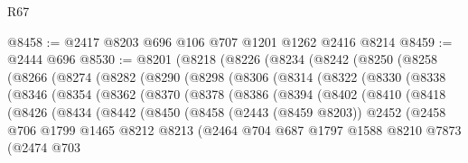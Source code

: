 \begin{lexlean}{R67}
\begin{coremodule}
@8458 := @2417 @8203 @696 @106 @707 @1201 @1262 @2416 @8214
@8459 := @2444 @696
@8530 := @8201
    (@8218
      (@8226
        (@8234
          (@8242
            (@8250
              (@8258
                (@8266
                  (@8274
                    (@8282
                      (@8290
                        (@8298
                          (@8306
                            (@8314
                              (@8322
                                (@8330
                                  (@8338
                                    (@8346
                                      (@8354
                                        (@8362
                                          (@8370
                                            (@8378
                                              (@8386
                                                (@8394
                                                  (@8402
                                                    (@8410
                                                      (@8418
                                                        (@8426
                                                          (@8434
                                                            (@8442
                                                              (@8450
                                                                (@8458
                                                                  (@2443 (@8459 @8203))
                                                                  @2452
                                                                  (@2458
                                                                    @706
                                                                    @1799
                                                                    @1465
                                                                    @8212
                                                                    @8213
                                                                    (@2464
                                                                      @704
                                                                      @687
                                                                      @1797
                                                                      @1588
                                                                      @8210
                                                                      @7873
                                                                      (@2474
                                                                        @703

\end{coremodule}
\end{lexlean}
